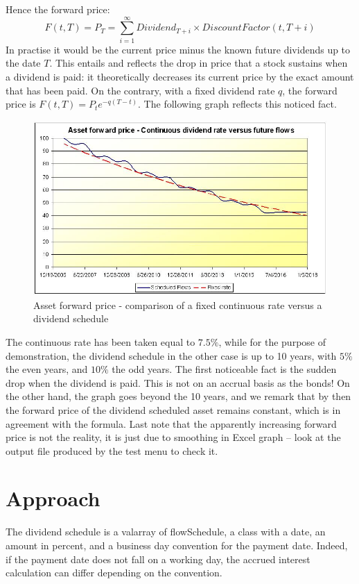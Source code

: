 Hence the forward price:
\[
F(t,T)=P_T=\sum_{i=1}^\infty Dividend_{T+i}\times DiscountFactor(t,T+i)
\]
In practise it would be the current price minus the known future dividends up to the date $T$. This entails and reflects the drop in price that a stock sustains when a dividend is paid: it theoretically decreases its current price by the exact amount that has been paid. On the contrary, with a fixed dividend rate $q$, the forward price is $F(t,T)=P_t e^{-q(T-t)}$. The following graph reflects this noticed fact.
\begin{figure}
\begin{center}
        \includegraphics[width=12cm]{assetFWD.jpg}
        \caption{Asset forward price - comparison of a fixed continuous rate versus a dividend schedule}
\end{center}
\end{figure}

The continuous rate has been taken equal to $7.5\%$, while for the purpose of demonstration, the dividend schedule in the other case is up to 10 years, with $5\%$ the even years, and $10\%$ the odd years. The first noticeable fact is the sudden drop when the dividend is paid. This is not on an accrual basis as the bonds! On the other hand, the graph goes beyond the 10 years, and we remark that by then the forward price of the dividend scheduled asset remains constant, which is in agreement with the formula. Last note that the apparently increasing forward price is not the reality, it is just due to smoothing in Excel graph -- look at the output file produced by the test menu to check it.


\section{Approach}

\par The dividend schedule is a valarray of flowSchedule, a class with a date, an amount in percent, and a business day convention for the payment date. Indeed, if the payment date does not fall on a working day, the accrued interest calculation can differ depending on the convention.

